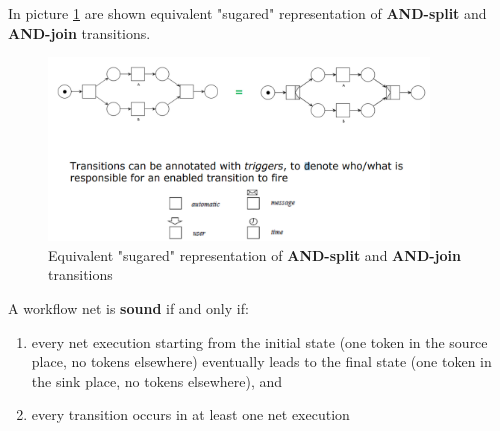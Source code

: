 \documentclass[10pt,a4paper]{report}
\begin{document}
In picture \ref{image82} are shown equivalent "sugared" representation of \textbf{AND-split} and \textbf{AND-join} transitions.  
\begin{figure}[h]
	\centering
	\includegraphics[width=0.9\textwidth]{image82}
	\caption{Equivalent "sugared" representation of \textbf{AND-split} and \textbf{AND-join} transitions}
	\label{image82}
\end{figure}
A workflow net is \textbf{sound} if and only if:
\begin{enumerate}
	\item every net execution starting from the initial state (one token in the source place, no tokens elsewhere)
	eventually leads to the final state (one token in the
	sink place, no tokens elsewhere), and
	\item every transition occurs in at least one net execution
\end{enumerate}
\end{document}
